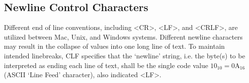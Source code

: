 \subsection{Newline Control Characters}
Different end of line conventions, including \textless{}CR\textgreater{}, \textless{}LF\textgreater{}, and \textless{}CRLF\textgreater{}, are utilized between Mac, Unix, and Windows systems. Different newline characters may result in the collapse of values into one long line of text. To maintain intended linebreaks, CLF specifies that the `newline' string, i.e. the byte(s) to be interpreted as ending each line of text, shall be the single code value $10_{10} = 0\mathrm{A}_{16}$ (ASCII `Line Feed' character), also indicated \textless{}LF\textgreater{}. 


